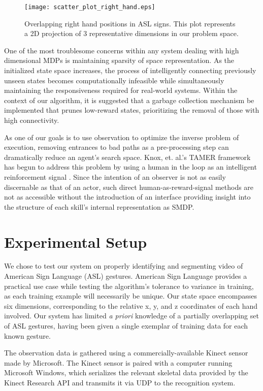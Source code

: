 \documentclass[letterpaper]{article}
\begin{document}
\begin{figure}[tb]
\begin{center}
\texttt{[image: scatter\_plot\_right\_hand.eps]}
\caption{Overlapping right hand positions in ASL signs. This plot represents a 2D projection of 3 representative dimensions in our problem space.}
\label{fig:asl_sign_overlap}
\end{center}
\end{figure}

One of the most troublesome concerns within any system dealing with high dimensional MDPs is maintaining sparsity of space representation. As the initialized state space increases, the process of intelligently connecting previously unseen states becomes computationally infeasible while simultaneously maintaining the responsiveness required for real-world systems. Within the context of our algorithm, it is suggested that a garbage collection mechanism be implemented that prunes low-reward states, prioritizing the removal of those with high connectivity. 

As one of our goals is to use observation to optimize the inverse problem of execution, removing entrances to bad paths as a pre-processing step can dramatically reduce an agent's search space. Knox, et. al.'s TAMER framework has begun to address this problem by using a human in the loop as an intelligent reinforcement signal \cite{TAMER}. Since the intention of an observer is not as easily discernable as that of an actor, such direct human-as-reward-signal methods are not as accessible without the introduction of an interface providing insight into the structure of each skill's internal representation as SMDP.

\section{Experimental Setup}
\label{sec:experiment}
We chose to test our system on properly identifying and segmenting video of American Sign Language (ASL) gestures. American Sign Language provides a practical use case while testing the algorithm's tolerance to variance in training, as each training example will necessarily be unique. Our state space encompasses six dimensions, corresponding to the relative x, y, and z coordinates of each hand involved.  Our system has limited \textit{a priori} knowledge of a partially overlapping set of ASL gestures, having been given a single exemplar of training data for each known gesture.

The observation data is gathered using a commercially-available Kinect sensor made by Microsoft.  The Kinect sensor is paired with a computer running Microsoft Windows, which serializes the relevant skeletal data provided by the Kinect Research API and transmits it via UDP to the recognition system.
\end{document}

